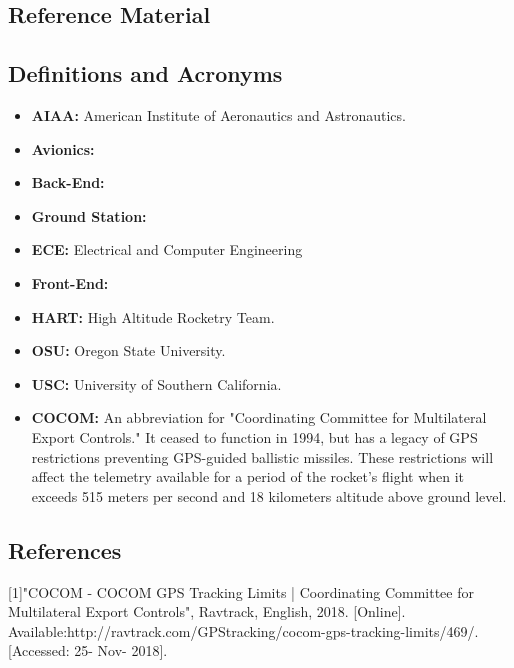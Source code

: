 \documentclass[onecolumn, draftclsnofoot,10pt, compsoc]{IEEEtran}
\begin{document}
\subsection{Reference Material}

\subsection{Definitions and Acronyms}
\begin{itemize}
	\item \textbf{AIAA:}
		American Institute of Aeronautics and Astronautics.
	\item \textbf{Avionics:}
	
	\item \textbf{Back-End:}
	
	\item \textbf{Ground Station:}
	
	\item \textbf{ECE:}
		Electrical and Computer Engineering
	\item \textbf{Front-End:}
	
	\item \textbf{HART:}
		High Altitude Rocketry Team.
	\item \textbf{OSU:}
		Oregon State University.
	\item \textbf{USC:}
		University of Southern California.
	\item \textbf{COCOM:}
		An abbreviation for "Coordinating Committee for Multilateral Export Controls."
		It ceased to function in 1994, but has a legacy of GPS restrictions preventing GPS-guided ballistic missiles.
		These restrictions will affect the telemetry available for a period of the rocket's flight when it exceeds 515 meters per second and 18 kilometers altitude above ground level.
\end{itemize}

\subsection{References}
			
	[1]"COCOM - COCOM GPS Tracking Limits | Coordinating Committee for Multilateral Export Controls", Ravtrack, English, 2018. [Online]. Available:http://ravtrack.com/GPStracking/cocom-gps-tracking-limits/469/. [Accessed: 25- Nov- 2018].

\newpage

\end{document}
